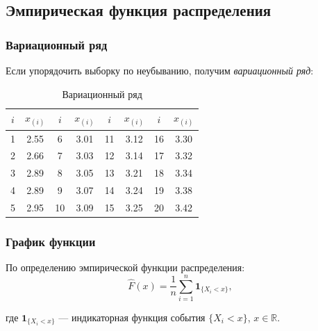 \subsection{Эмпирическая функция распределения}

\subsubsection{Вариационный ряд}

Если упорядочить выборку по неубыванию, получим \textit{вариационный ряд}:

\begin{table}[h!]
\centering
\begin{tabular}{|c|c||c|c||c|c||c|c|}
\hline
$i$ & $x_{(i)}$ & $i$ & $x_{(i)}$ & $i$ & $x_{(i)}$ & $i$ & $x_{(i)}$ \\ \hline \hline
1 & 2.55 & 6 & 3.01 & 11 & 3.12 & 16 & 3.30 \\ \hline
2 & 2.66 & 7 & 3.03 & 12 & 3.14 & 17 & 3.32 \\ \hline
3 & 2.89 & 8 & 3.05 & 13 & 3.21 & 18 & 3.34 \\ \hline
4 & 2.89 & 9 & 3.07 & 14 & 3.24 & 19 & 3.38 \\ \hline
5 & 2.95 & 10 & 3.09 & 15 & 3.25 & 20 & 3.42 \\ \hline
\end{tabular}
\caption{Вариационный ряд}
\end{table}

\subsubsection{График функции}

По определению эмпирической функции распределения:
\[
    \hat{F}(x)=\dfrac{1}{n}\sum_{i=1}^n\mathbf{1}_{\{X_i<x\}},
\]

где \( \mathbf{1}_{\{X_i<x\}} \) --- индикаторная функция события \( \{X_i< x\} \), \( x\in\mathbb{R} \).


